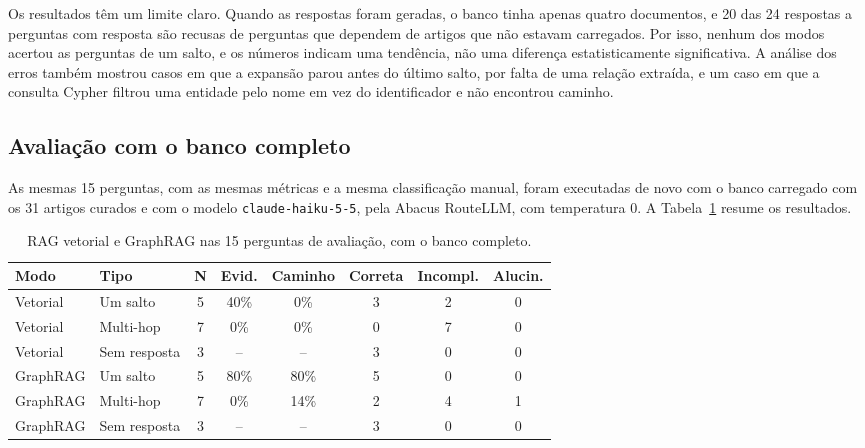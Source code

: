 \documentclass[12pt]{article}
\begin{document}
Os resultados têm um limite claro. Quando as respostas foram geradas, o banco tinha
apenas quatro documentos, e 20 das 24 respostas a perguntas com resposta são recusas de
perguntas que dependem de artigos que não estavam carregados. Por isso, nenhum dos modos
acertou as perguntas de um salto, e os números indicam uma tendência, não uma diferença
estatisticamente significativa. A análise dos erros também mostrou casos em que a
expansão parou antes do último salto, por falta de uma relação extraída, e um caso em que
a consulta Cypher filtrou uma entidade pelo nome em vez do identificador e não encontrou
caminho.

\subsection{Avaliação com o banco completo}
\label{sec:avaliacao-completo}

As mesmas 15 perguntas, com as mesmas métricas e a mesma classificação manual, foram
executadas de novo com o banco carregado com os 31 artigos curados e com o modelo
\texttt{claude-haiku-5-5}, pela Abacus RouteLLM, com temperatura 0. A
Tabela~\ref{tab:avaliacao-completo} resume os resultados.

\begin{table}[ht]
\centering
\caption{RAG vetorial e GraphRAG nas 15 perguntas de avaliação, com o banco completo.}
\label{tab:avaliacao-completo}
\small
\begin{tabular}{llcccccc}
\toprule
\textbf{Modo} & \textbf{Tipo} & \textbf{N} & \textbf{Evid.} & \textbf{Caminho} & \textbf{Correta} & \textbf{Incompl.} & \textbf{Alucin.} \\
\midrule
Vetorial & Um salto & 5 & 40\% & 0\% & 3 & 2 & 0 \\
Vetorial & Multi-hop & 7 & 0\% & 0\% & 0 & 7 & 0 \\
Vetorial & Sem resposta & 3 & -- & -- & 3 & 0 & 0 \\
GraphRAG & Um salto & 5 & 80\% & 80\% & 5 & 0 & 0 \\
GraphRAG & Multi-hop & 7 & 0\% & 14\% & 2 & 4 & 1 \\
GraphRAG & Sem resposta & 3 & -- & -- & 3 & 0 & 0 \\
\bottomrule
\end{tabular}
\end{table}
\end{document}
